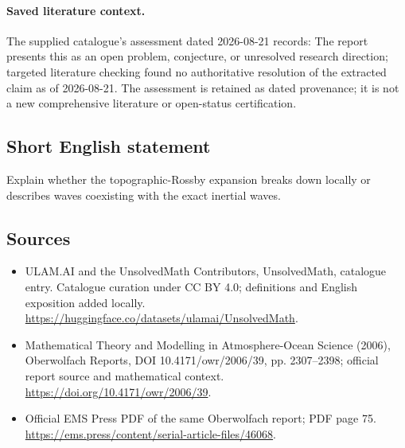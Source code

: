 \documentclass[11pt]{article}
\begin{document}
\paragraph{Saved literature context.} The supplied catalogue's assessment dated 2026-08-21 records: The report presents this as an open problem, conjecture, or unresolved research direction; targeted literature checking found no authoritative resolution of the extracted claim as of 2026-08-21. The assessment is retained as dated provenance; it is not a new comprehensive literature or open-status certification.
\subsection{Short English statement}
Explain whether the topographic-Rossby expansion breaks down locally or describes waves coexisting with the exact inertial waves.
\subsection{Sources}
\begin{itemize}
\item[\hypertarget{source:statement:1}{S1}] ULAM.AI and the UnsolvedMath Contributors, UnsolvedMath, catalogue entry. Catalogue curation under CC BY 4.0; definitions and English exposition added locally.
\url{https://huggingface.co/datasets/ulamai/UnsolvedMath}.
\item[\hypertarget{source:statement:2}{S2}] Mathematical Theory and Modelling in Atmosphere-Ocean Science (2006), Oberwolfach Reports, DOI 10.4171/owr/2006/39, pp. 2307--2398; official report source and mathematical context.
\url{https://doi.org/10.4171/owr/2006/39}.
\item[\hypertarget{source:statement:3}{S3}] Official EMS Press PDF of the same Oberwolfach report; PDF page 75.
\url{https://ems.press/content/serial-article-files/46068}.
\end{itemize}
\label{end:statement}
\end{document}
